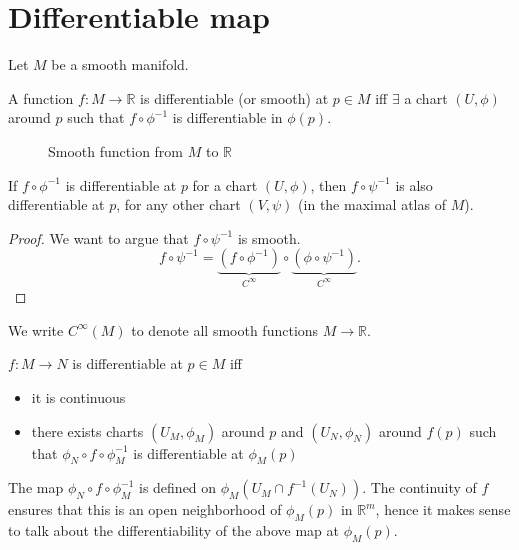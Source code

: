 \section{Differentiable map}
Let $M$ be a smooth manifold.

\begin{definition}
    A function $f: M \to  \mathbb R$ is differentiable (or smooth) at $p \in M$ iff $\exists$ a chart $(U, \phi)$ around $p$ such that $f \circ \phi^{-1}$ is differentiable in $\phi(p)$.
\end{definition}


\begin{figure}[H]
    \centering
    \caption{Smooth function from $M$ to $\mathbb R$}
    \label{fig:smooth-function-to-r}
\end{figure}

\begin{remark}
    If $f \circ \phi^{-1}$ is differentiable at $p$ for a chart $(U, \phi)$, then $f \circ \psi^{-1}$ is also differentiable at $p$, for any other chart $(V,\psi)$ (in the maximal atlas of $M$).
\end{remark}
\begin{proof}
    We want to argue that $f \circ \psi^{-1}$ is smooth.
    \[
        f \circ \psi^{-1} = \underbrace{(f \circ \phi^{-1})}_{C^{\infty}} \circ \underbrace{(\phi \circ \psi^{-1})}_{C^{\infty}}
    .\] 
\end{proof}
\begin{notation}
    We write $C^{\infty}(M)$ to denote all smooth functions  $M \to  \mathbb R$.
\end{notation}
\begin{definition}

    $f: M \to  N$ is differentiable at $p \in M$ iff
    \begin{itemize}
        \item it is continuous
        \item there exists charts $(U_M,\phi_M)$ around $p$ and $(U_N,\phi_N)$  around $f(p)$ such that 
            $\phi_N \circ f \circ \phi_M^{-1}$ is differentiable at $\phi_M(p)$
    \end{itemize}

\end{definition}
\begin{remark} The map $\phi_N \circ f \circ \phi_M^{-1}$  is defined on 
$\phi_M(U_M\cap f^{-1}(U_N))$.
The continuity of $f$ ensures that this is an open neighborhood of $\phi_M(p)$ in $\mathbb{R}^m$, hence it makes sense to talk about the differentiability of the above map at 
$\phi_M(p)$.
\end{remark}

